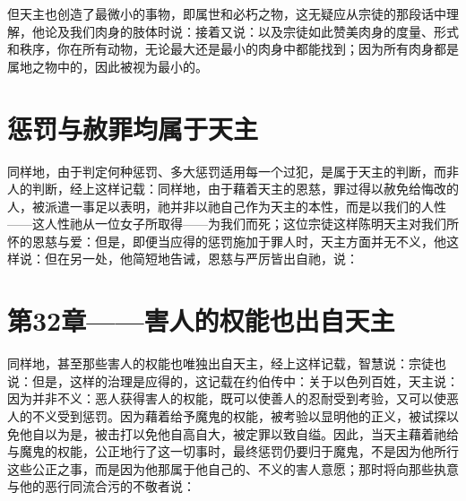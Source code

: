 但天主也创造了最微小的事物，即属世和必朽之物，这无疑应从宗徒的那段话中理解，他论及我们肉身的肢体时说：接着又说：以及宗徒如此赞美肉身的度量、形式和秩序，你在所有动物，无论最大还是最小的肉身中都能找到；因为所有肉身都是属地之物中的，因此被视为最小的。\par


\section{惩罚与赦罪均属于天主}

同样地，由于判定何种惩罚、多大惩罚适用每一个过犯，是属于天主的判断，而非人的判断，经上这样记载：同样地，由于藉着天主的恩慈，罪过得以赦免给悔改的人，被派遣一事足以表明，祂并非以祂自己作为天主的本性，而是以我们的人性——这人性祂从一位女子所取得——为我们而死；这位宗徒这样陈明天主对我们所怀的恩慈与爱：但是，即便当应得的惩罚施加于罪人时，天主方面并无不义，他这样说：但在另一处，他简短地告诫，恩慈与严厉皆出自祂，说：\par


\section{第32章——害人的权能也出自天主}

同样地，甚至那些害人的权能也唯独出自天主，经上这样记载，智慧说：宗徒也说：但是，这样的治理是应得的，这记载在约伯传中：关于以色列百姓，天主说：因为并非不义：恶人获得害人的权能，既可以使善人的忍耐受到考验，又可以使恶人的不义受到惩罚。因为藉着给予魔鬼的权能，被考验以显明他的正义，被试探以免他自以为是，被击打以免他自高自大，被定罪以致自缢。因此，当天主藉着祂给与魔鬼的权能，公正地行了这一切事时，最终惩罚仍要归于魔鬼，不是因为他所行这些公正之事，而是因为他那属于他自己的、不义的害人意愿；那时将向那些执意与他的恶行同流合污的不敬者说：\par

